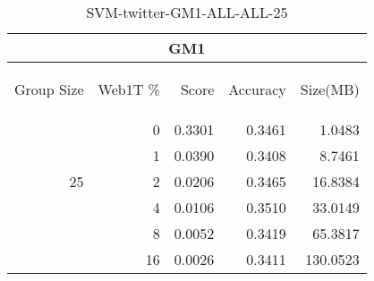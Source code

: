 \begin{center}
\begin{table}[htbp] 
 \begin{center}
\begin{tabular}{ | r | r | r | r | r |}
\hline
\multicolumn{5}{|c|}{GM1}\\
\hline
\begin{sideways}Group Size\end{sideways} & \begin{sideways}Web1T \%\end{sideways} & \begin{sideways}Score\end{sideways} & \begin{sideways}Accuracy\end{sideways} & \begin{sideways}Size(MB)\end{sideways}\\
\hline
\multirow{5}{*}{25}
 & 0 & 0.3301 & 0.3461 & 1.0483\\ \cline{2-5}
 & 1 & 0.0390 & 0.3408 & 8.7461\\ \cline{2-5}
 & 2 & 0.0206 & 0.3465 & 16.8384\\ \cline{2-5}
 & 4 & 0.0106 & 0.3510 & 33.0149\\ \cline{2-5}
 & 8 & 0.0052 & 0.3419 & 65.3817\\ \cline{2-5}
 & 16 & 0.0026 & 0.3411 & 130.0523\\ \cline{2-5}
\hline
\end{tabular}
\caption{SVM-twitter-GM1-ALL-ALL-25}
\label{table:SVM-twitter-GM1-ALL-ALL-25}
\end{center}
 \end{table}
\end{center}


